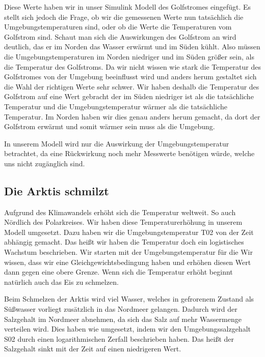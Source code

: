 \documentclass[a4paper,twoside]{article}
\begin{document}
	Diese Werte haben wir in unser Simulink Modell des Golfstromes eingefügt. Es stellt sich jedoch die Frage, ob wir die gemessenen Werte nun tatsächlich die Umgebungstemperaturen sind, oder ob die Werte die Temperaturen vom Golfstrom sind. Schaut man sich die Auswirkungen des Golfstrom an wird deutlich, das er im Norden das Wasser erwärmt und im Süden kühlt. Also müssen die Umgebungstemperaturen im Norden niedriger und im Süden größer sein, als die Temperatur des Golfstroms. Da wir nicht wissen wie stark die Temperatur des Golfstromes von der Umgebung beeinflusst wird und anders herum gestaltet sich die Wahl der richtigen Werte sehr schwer. Wir haben deshalb die Temperatur des Golfstrom auf eine Wert gebracht der im Süden niedriger ist als die tatsächliche Temperatur und die Umgebungstemperatur wärmer als die tatsächliche Temperatur. Im Norden haben wir dies genau anders herum gemacht, da dort der Golfstrom erwärmt und somit wärmer sein muss als die Umgebung.
	
	In unserem Modell wird nur die Auswirkung der Umgebungstemperatur betrachtet, da eine Rückwirkung noch mehr Messwerte benötigen würde, welche uns nicht zugänglich sind.  
	

	\subsection{Die Arktis schmilzt}
	
	Aufgrund des Klimawandels erhöht sich die Temperatur weltweit. So auch Nördlich des Polarkreises. Wir haben diese Temperaturerhöhung in unserem Modell umgesetzt. Dazu haben wir die Umgebungstemperatur T02 von der Zeit abhängig gemacht. Das heißt wir haben die Temperatur doch ein logistisches Wachstum beschrieben. Wir starten mit der Umgebungstemperatur für die Wir wissen, dass wir eine Gleichgewichtsbedingung haben und erhöhen diesen Wert dann gegen eine obere Grenze. Wenn sich die Temperatur erhöht beginnt natürlich auch das Eis zu schmelzen.
		
	Beim Schmelzen der Arktis wird viel Wasser, welches in gefrorenem Zustand als Süßwasser vorliegt zusätzlich in das Nordmeer gelangen. Dadurch wird der Salzgehalt im Nordmeer abnehmen, da sich das Salz auf mehr Wassermenge verteilen wird. Dies haben wie umgesetzt, indem wir den Umgebungssalzgehalt S02 durch einen logarithmischen Zerfall beschrieben haben. Das heißt der Salzgehalt sinkt mit der Zeit auf einen niedrigeren Wert. 
	
\end{document}
